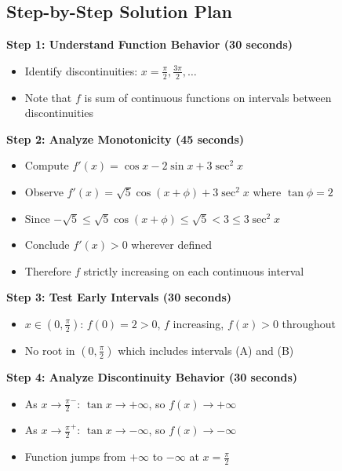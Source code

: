 \documentclass[]{article}
\begin{document}
\begin{roadmapbox}
\subsection*{Step-by-Step Solution Plan}

\textbf{Step 1: Understand Function Behavior (30 seconds)}
\begin{itemize}
    \item Identify discontinuities: $x = \frac{\pi}{2}, \frac{3\pi}{2}, \ldots$
    \item Note that $f$ is sum of continuous functions on intervals between discontinuities
\end{itemize}

\textbf{Step 2: Analyze Monotonicity (45 seconds)}
\begin{itemize}
    \item Compute $f'(x) = \cos{x} - 2\sin{x} + 3\sec^2{x}$
    \item Observe $f'(x) = \sqrt{5}\cos(x+\phi) + 3\sec^2{x}$ where $\tan\phi = 2$
    \item Since $-\sqrt{5} \leq \sqrt{5}\cos(x+\phi) \leq \sqrt{5} < 3 \leq 3\sec^2{x}$
    \item Conclude $f'(x) > 0$ wherever defined
    \item Therefore $f$ strictly increasing on each continuous interval
\end{itemize}

\textbf{Step 3: Test Early Intervals (30 seconds)}
\begin{itemize}
    \item $x \in (0, \frac{\pi}{2})$: $f(0) = 2 > 0$, $f$ increasing, $f(x) > 0$ throughout
    \item No root in $(0, \frac{\pi}{2})$ which includes intervals (A) and (B)
\end{itemize}

\textbf{Step 4: Analyze Discontinuity Behavior (30 seconds)}
\begin{itemize}
    \item As $x \to \frac{\pi}{2}^-$: $\tan{x} \to +\infty$, so $f(x) \to +\infty$
    \item As $x \to \frac{\pi}{2}^+$: $\tan{x} \to -\infty$, so $f(x) \to -\infty$
    \item Function jumps from $+\infty$ to $-\infty$ at $x = \frac{\pi}{2}$
\end{itemize}


\end{roadmapbox}
\end{document}
